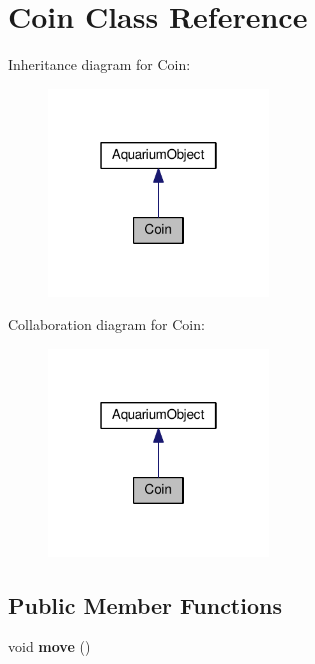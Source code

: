 \hypertarget{class_coin}{}\section{Coin Class Reference}
\label{class_coin}


Inheritance diagram for Coin\+:\nopagebreak
\begin{figure}[H]
\begin{center}
\leavevmode
\includegraphics[width=166pt]{class_coin__inherit__graph}
\end{center}
\end{figure}


Collaboration diagram for Coin\+:\nopagebreak
\begin{figure}[H]
\begin{center}
\leavevmode
\includegraphics[width=166pt]{class_coin__coll__graph}
\end{center}
\end{figure}
\subsection*{Public Member Functions}
\begin{DoxyCompactItemize}
\item 
\mbox{\label{class_coin_ab62bca5834489b9b483deaa3ca3470e9}} 
void {\bfseries move} ()
\end{DoxyCompactItemize}
